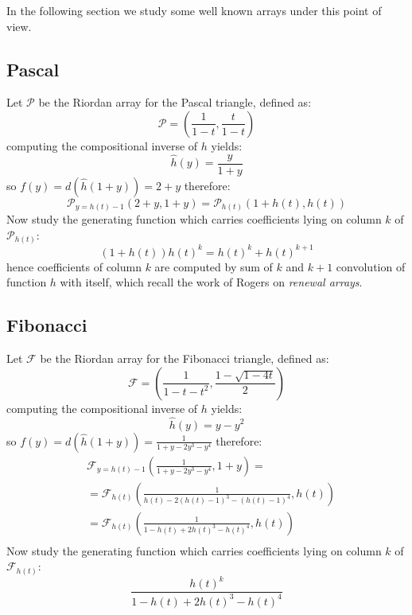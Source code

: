 \documentclass[11pt,a4paper]{article} %
\begin{document}
    In the following section we study some well known arrays under this point of view.

    \subsection{Pascal}
    Let $\mathcal{P}$ be the Riordan array for the Pascal triangle,
    defined as:
    \begin{displaymath} 
        \mathcal{P} = \left(\frac{1}{1-t}, \frac{t}{1-t}  \right)
    \end{displaymath} 
    computing the compositional inverse of $h$ yields:
    \begin{displaymath} 
        \hat{h}(y) = \frac{y}{1+y}
    \end{displaymath} 
    so $f(y)=d(\hat{h}(1+y))=2+y$ therefore:
    \begin{displaymath} 
        \mathcal{P}_{y=h(t)-1}\left( 2+y, 1+y \right)= \mathcal{P}_{h(t)}\left( 1+h(t), h(t) \right)
    \end{displaymath} 
    Now study the generating function which carries coefficients lying on column $k$
    of $\mathcal{P}_{h(t)}$:
    \begin{displaymath} 
        (1+h(t))h(t)^{k} = h(t)^k + h(t)^{k+1}
    \end{displaymath} 
    hence coefficients of column $k$ are computed by sum of $k$ and $k+1$ convolution 
    of function $h$ with itself, which recall the work of Rogers on \emph{renewal arrays}.

    \subsection{Fibonacci}
    Let $\mathcal{F}$ be the Riordan array for the Fibonacci triangle,
    defined as:
    \begin{displaymath} 
        \mathcal{F} = \left(\frac{1}{1-t-t^2}, \frac{1-\sqrt{1-4t}}{2}  \right)
    \end{displaymath} 
    computing the compositional inverse of $h$ yields:
    \begin{displaymath} 
        \hat{h}(y) = y - y^2
    \end{displaymath} 
    so $f(y)=d(\hat{h}(1+y))=\frac{1}{1+y-2y^3-y^4}$ therefore:
    \begin{displaymath} 
        \begin{split} 
            & \mathcal{F}_{y=h(t)-1}\left( \frac{1}{1+y-2y^3-y^4}, 1+y \right) = \\
             &= \mathcal{F}_{h(t)}\left( \frac{1}{h(t)-2(h(t)-1)^3-(h(t)-1)^4}, h(t) \right)\\
             &= \mathcal{F}_{h(t)}\left( \frac{1}{1-h(t)+2h(t)^3-h(t)^4}, h(t) \right)\\
        \end{split} 
    \end{displaymath} 
    Now study the generating function which carries coefficients lying on column $k$
    of $\mathcal{F}_{h(t)}$:
    \begin{displaymath} 
        \frac{h(t)^k}{1-h(t)+2h(t)^3-h(t)^4}
    \end{displaymath} 
\end{document}
